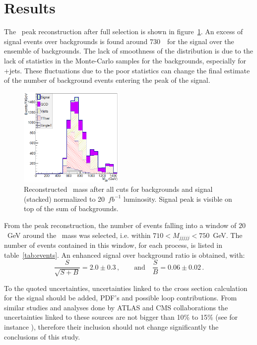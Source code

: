 \section{Results}
\label{sec:Pres}

The \Tp~peak reconstruction after full selection is shown in figure~\ref{fig:M5J}. An excess of signal events over backgrounds is found around 730~\GeVcc~for the signal over the ensemble of backgrounds. The lack of smoothness of the distribution is due to the lack of statistics in the Monte-Carlo samples for the  backgrounds, especially for \W+jets. These fluctuations due to the poor statistics can change the final estimate of the number of background events entering the peak of the signal. 

\begin{figure}[!Hhtbp]
  \begin{center}
    \includegraphics[width=0.45\textwidth]{figs/Pheno/Final.png}
    \caption{Reconstructed \Tp~mass after all cuts for backgrounds and signal (stacked) normalized to 20~$fb^{-1}$ luminosity. Signal peak is visible on top of the sum of backgrounds.}
    \label{fig:M5J}
  \end{center}
\end{figure}

From the peak reconstruction, the number of events falling into a window of $20$~GeV around the \Tp~mass was selected, i.e. within $710 < M_{jjjjj} < 750$~GeV. The number of events contained in this window, for each process, is listed in table~\ref{tab:events}. An enhanced signal over background ratio is obtained, with:
\begin{equation}
\frac{S}{\sqrt{S+B}}=2.0\pm 0.3\,, \qquad \mbox{and} \quad \frac{S}{B}=0.06\pm 0.02\,. 
\end{equation}

To the quoted uncertainties, uncertainties linked to the cross section calculation for the signal should be added, PDF's and possible loop contributions. From similar studies and analyses done by ATLAS and CMS collaborations the uncertainties linked to these sources are not bigger than 10\% to 15\% (see for instance \cite{Aad:2011yn}), therefore their inclusion should not change significantly the conclusions of this study.

